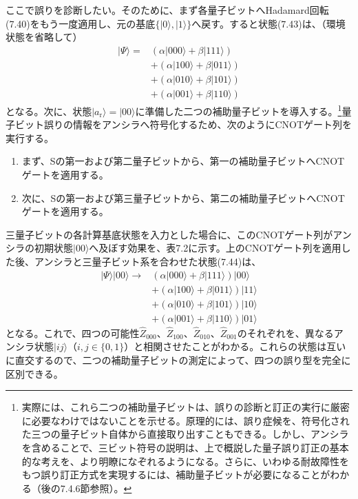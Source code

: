 ここで誤りを診断したい。そのために、まず各量子ビットへHadamard回転(7.40)をもう一度適用し、元の基底$\{|0\rangle,|1\rangle\}$へ戻す。すると状態(7.43)は、（環境状態を省略して）
\begin{equation}\begin{aligned}|\Psi\rangle={}&(\alpha|000\rangle+\beta|111\rangle)\\&+(\alpha|100\rangle+\beta|011\rangle)\\&+(\alpha|010\rangle+\beta|101\rangle)\\&+(\alpha|001\rangle+\beta|110\rangle)\end{aligned}\tag{7.44}\end{equation}
となる。次に、状態$|a_{\mathrm r}\rangle=|00\rangle$に準備した二つの補助量子ビットを導入する。\footnote{実際には、これら二つの補助量子ビットは、誤りの診断と訂正の実行に厳密に必要なわけではないことを示せる。原理的には、誤り症候を、符号化された三つの量子ビット自体から直接取り出すこともできる。しかし、アンシラを含めることで、三ビット符号の説明は、上で概説した量子誤り訂正の基本的な考えを、より明瞭になぞれるようになる。さらに、いわゆる耐故障性をもつ誤り訂正方式を実現するには、補助量子ビットが必要になることがわかる（後の7.4.6節参照）。}量子ビット誤りの情報をアンシラへ符号化するため、次のようにCNOTゲート列を実行する。
\hypertarget{srcpage:318}{}\label{srcpage:318}
\begin{enumerate}
\item まず、Sの第一および第二量子ビットから、第一の補助量子ビットへCNOTゲートを適用する。
\item 次に、Sの第一および第三量子ビットから、第二の補助量子ビットへCNOTゲートを適用する。
\end{enumerate}
三量子ビットの各計算基底状態を入力とした場合に、このCNOTゲート列がアンシラの初期状態$|00\rangle$へ及ぼす効果を、表7.2に示す。上のCNOTゲート列を適用した後、アンシラと三量子ビット系を合わせた状態(7.44)は、
\begin{equation}\begin{aligned}|\Psi\rangle|00\rangle\longrightarrow{}&(\alpha|000\rangle+\beta|111\rangle)|00\rangle\\&+(\alpha|100\rangle+\beta|011\rangle)|11\rangle\\&+(\alpha|010\rangle+\beta|101\rangle)|10\rangle\\&+(\alpha|001\rangle+\beta|110\rangle)|01\rangle\end{aligned}\tag{7.45}\end{equation}
となる。これで、四つの可能性$\hat Z_{000}$、$\hat Z_{100}$、$\hat Z_{010}$、$\hat Z_{001}$のそれぞれを、異なるアンシラ状態$|ij\rangle$（$i,j\in\{0,1\}$）と相関させたことがわかる。これらの状態は互いに直交するので、二つの補助量子ビットの測定によって、四つの誤り型を完全に区別できる。

